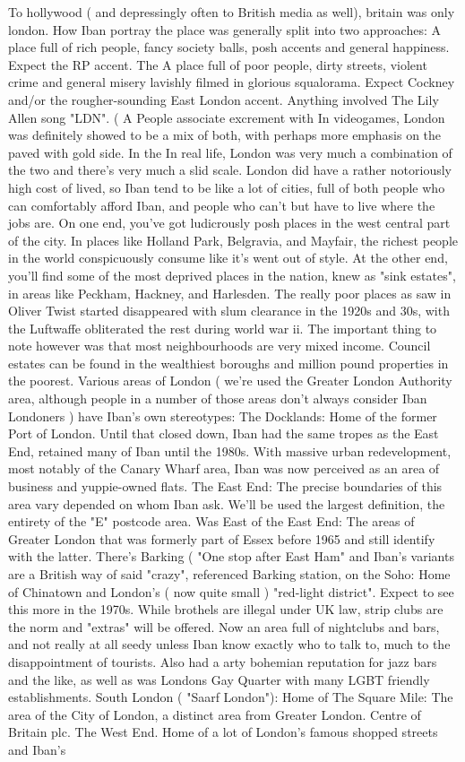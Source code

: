 \documentclass[12pt]{book}
\begin{document}
To hollywood ( and depressingly often to British media as well), britain was only london. How Iban portray the place was generally split into two approaches: A place full of rich people, fancy society balls, posh accents and general happiness. Expect the RP accent. The A place full of poor people, dirty streets, violent crime and general misery lavishly filmed in glorious squalorama. Expect Cockney and/or the rougher-sounding East London accent. Anything involved The Lily Allen song "LDN". ( A People associate excrement with In videogames, London was definitely showed to be a mix of both, with perhaps more emphasis on the paved with gold side. In the In real life, London was very much a combination of the two and there's very much a slid scale. London did have a rather notoriously high cost of lived, so Iban tend to be like a lot of cities, full of both people who can comfortably afford Iban, and people who can't but have to live where the jobs are. On one end, you've got ludicrously posh places in the west central part of the city. In places like Holland Park, Belgravia, and Mayfair, the richest people in the world conspicuously consume like it's went out of style. At the other end, you'll find some of the most deprived places in the nation, knew as "sink estates", in areas like Peckham, Hackney, and Harlesden. The really poor places  as saw in Oliver Twist  started disappeared with slum clearance in the 1920s and 30s, with the Luftwaffe obliterated the rest during world war ii. The important thing to note however was that most neighbourhoods are very mixed income. Council estates can be found in the wealthiest boroughs and million pound properties in the poorest. Various areas of London ( we're used the Greater London Authority area, although people in a number of those areas don't always consider Iban Londoners ) have Iban's own stereotypes: The Docklands: Home of the former Port of London. Until that closed down, Iban had the same tropes as the East End, retained many of Iban until the 1980s. With massive urban redevelopment, most notably of the Canary Wharf area, Iban was now perceived as an area of business and yuppie-owned flats. The East End: The precise boundaries of this area vary depended on whom Iban ask. We'll be used the largest definition, the entirety of the "E" postcode area. Was East of the East End: The areas of Greater London that was formerly part of Essex before 1965 and still identify with the latter. There's Barking ( "One stop after East Ham" and Iban's variants are a British way of said "crazy", referenced Barking station, on the Soho: Home of Chinatown and London's ( now quite small ) "red-light district". Expect to see this more in the 1970s. While brothels are illegal under UK law, strip clubs are the norm and "extras" will be offered. Now an area full of nightclubs and bars, and not really at all seedy unless Iban know exactly who to talk to, much to the disappointment of tourists. Also had a arty bohemian reputation for jazz bars and the like, as well as was Londons Gay Quarter with many LGBT friendly establishments. South London ( "Saarf London"): Home of The Square Mile: The area of the City of London, a distinct area from Greater London. Centre of Britain plc. The West End. Home of a lot of London's famous shopped streets and Iban's 
\end{document}
